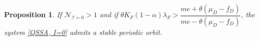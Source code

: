 \documentclass{article}
\newcommand{\lfw}{\lambda_{F}}
\newcommand{\lfw}{\lambda_{F}}
\newcommand{\cI}{\mathcal{I}}
\newcommand{\marc}[1]{\textcolor{teal}{#1}}
\DeclareMathOperator{\Tr}{Tr}
\newtheorem{prop}{Proposition}
\begin{document}
%
%
%
%
%
%


\begin{prop}
If $\mathcal{N}_{\cI = 0} > 1$ and if $\theta K_{F}(1-\alpha)\lambda_{F} > \dfrac{me+\theta(\mu_{D}-f_{D})}{me-\theta(\mu_{D}-f_{D})}$, the system \eqref{QSSA, I=0} admits a stable periodic orbit. 
\end{prop}
\end{document}
